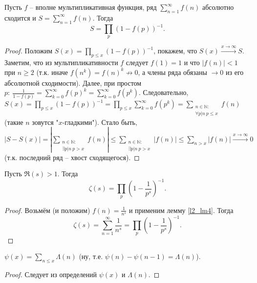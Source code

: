 
\begin{lemma} \label{l2_lm4}
	Пусть $f$ -- вполне мультипликативная функция, ряд $\displaystyle \sum\limits_{n=1}^\infty f(n)$ абсолютно сходится и $\displaystyle S = \sum\limits_{n=1}^\infty f(n)$. Тогда 
	$$S = \prod\limits_p(1-f(p))^{-1}.$$
\end{lemma}
\begin{proof}
	Положим $\displaystyle S(x) = \prod\limits_{p \leq x}(1-f(p))^{-1}$, покажем, что $S(x) \xrightarrow{x\to\infty} S$. Заметим, что из мультипликативности $f$ следует $f(1) = 1$ и что $|f(n)|<1$ при $n \geq 2$ (т.к. иначе $f(n^k)=f(n)^k \not \to 0$, а члены ряда обязаны $\to 0$ из его абсолютной сходимости). Далее, при простом $\displaystyle p: \ \frac{1}{1-f(p)} = \sum\limits_{k=0}^\infty f(p)^k = \sum\limits_{k=0}^\infty f(p^k)$. Следовательно, $\displaystyle S(x) = \prod\limits_{p\leq x} (1-f(p))^{-1} = \prod\limits_{p\leq x}\sum\limits_{k=0}^\infty f(p^k) = \sum\limits_{\substack{n\in\mathbb{N}: \\ \forall p|n \ p \leq x}}f(n)$ (такие $n$ зовутся "$x$-гладкими"). Стало быть, $\displaystyle \left|S-S(x)\right|=\left|\sum\limits_{\substack{n\in\mathbb{N}: \\ \exists p|n \ p > x}}f(n)\right| \leq \sum\limits_{\substack{n\in\mathbb{N}: \\ \exists p|n \ p > x}}\left|f(n)\right| \leq \sum\limits_{n>x}\left|f(n)\right| \xrightarrow{x\to\infty} 0$ (т.к. последний ряд -- хвост сходящегося).
\end{proof}

\begin{theorem} \label{l2_Euler_formula}
	Пусть $\Re(s)>1$. Тогда $$\zeta(s) = \prod\limits_p\left( 1-\frac{1}{p^s}\right)^{-1}.$$
\end{theorem}
\begin{proof} 
	Возьмём (и положим) $f(n) = \frac{1}{n^s}$ и применим лемму \ref{l2_lm4}. Тогда 
		$$\zeta(s) = \sum\limits_{n=1}^\infty \frac{1}{n^s} = \prod\limits_p\left( 1-\frac{1}{p^s} \right)^{-1}.$$
\end{proof}

\begin{lemma} \label{l2_lm5}
	$\displaystyle \psi(x) = \sum\limits_{n \leq x} \Lambda(n)$ (ну, т.е. $\psi(n)-\psi(n-1)=\Lambda(n)$).
\end{lemma}
\begin{proof}
	Следует из определений $\psi(x)$ и $\Lambda(n)$.
\end{proof}
